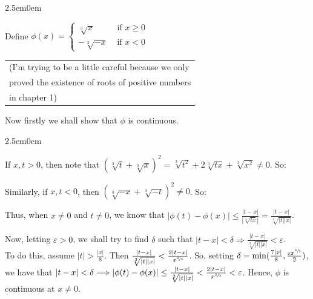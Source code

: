 \documentclass{book}
\newcommand{\pracTwo}{
   \color{Orange}%
   \fontsize{12}{14}\selectfont%
}
\newenvironment{myIndent}{%
   \begin{adjustwidth}{2.5em}{0em}%
}{%
   \end{adjustwidth}%
}
\newcommand{\retTwo}{\hfill\bigbreak}
\begin{document}
{\begin{myIndent}\pracTwo
   Define $\phi(x) = \left\{
   \begin{matrix}
      \sqrt[3]{x} & \text{ if } x \geq 0 \\
      -\sqrt[3]{-x} & \text{ if } x < 0
   \end{matrix}\right.$ \quad\quad 
   \begin{tabular}{l}
      (I'm trying to be a little careful because we only\\ proved the existence of roots of positive numbers\\ in chapter 1)
   \end{tabular}\retTwo

   Now firstly we shall show that $\phi$ is continuous.
   \begin{myIndent}
      If $x, t > 0$, then note that $\left(\sqrt[3]{t} + \sqrt[3]{x}\right)^2 = \sqrt[3]{t^2} + 2\sqrt[3]{tx} + \sqrt[3]{x^2} \neq 0$. So:
      
      {\retTwo\par}

      Similarly, if $x, t < 0$, then $\left(\sqrt[3]{-x} + \sqrt[3]{-t}\right)^2 \neq 0$. So:

      {\retTwo\par}

      Thus, when $x \neq 0$ and $t \neq 0$, we know that $|\phi(t) - \phi(x)| \leq \frac{|t - x|}{\left|\sqrt[3]{tx}\right|} = \frac{|t - x|}{\sqrt[3]{|t||x|}}$.\retTwo
      
      Now, letting $\varepsilon > 0$, we shall try to find $\delta$ such that $|t - x| < \delta \Longrightarrow \frac{|t - x|}{\sqrt[3]{|t||x|}} < \varepsilon$.\\ To do this, assume $|t| > \frac{|x|}{8}$. Then $\frac{|t-x|}{\sqrt[3]{|t||x|}} < \frac{2|t-x|}{x^{\sfrac{2}{3}}}$. So, setting $\delta = \min(\frac{7|x|}{8}, \frac{\varepsilon x^{\sfrac{2}{3}}}{2})$,\\ we have that $|t - x| < \delta \Longrightarrow |\phi(t) - \phi(x)| \leq \frac{|t-x|}{\sqrt[3]{|t||x|}} < \frac{2|t-x|}{x^{\sfrac{2}{3}}} < \varepsilon$. Hence, $\phi$ is\\ continuous at $x \neq 0$.\\ [6pt]


\end{myIndent}
\end{myIndent}}
\end{document}
